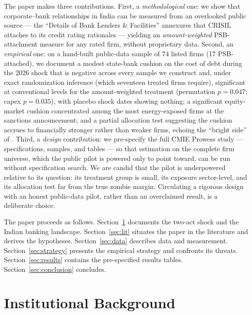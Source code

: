 \documentclass[12pt]{article}
\begin{document}
The paper makes three contributions. First, a \emph{methodological} one: we show that
corporate--bank relationships in India can be measured from an overlooked public source ---
the ``Details of Bank Lenders \& Facilities'' annexures that CRISIL attaches to its credit
rating rationales --- yielding an \emph{amount-weighted} PSB-attachment measure for any
rated firm, without proprietary data. Second, an \emph{empirical} one: on a hand-built
public-data sample of 74 listed firms (17 PSB-attached), we document a modest state-bank
cushion on the cost of debt during the 2026 shock that is negative across every sample we
construct and, under exact randomization inference (which seventeen treated firms require),
significant at conventional levels for the amount-weighted treatment (permutation $p=0.047$;
capex $p=0.035$), with placebo shock dates showing nothing; a significant equity-market
cushion concentrated among the most energy-exposed firms at the sanctions announcement; and
a partial allocation test suggesting the cushion accrues to financially stronger rather than
weaker firms, echoing the ``bright side'' of \citet{lin2015government}. Third, a \emph{design} contribution: we pre-specify the
full CMIE Prowess study --- specifications, samples, and tables --- so that estimation on the
complete firm universe, which the public pilot is powered only to point toward, can be run
without specification search. We are candid that the pilot is underpowered relative to its
question: its treatment group is small, its exposure sector-level, and its allocation test
far from the true zombie margin. Circulating a rigorous design with an honest public-data
pilot, rather than an overclaimed result, is a deliberate choice.

The paper proceeds as follows. Section~\ref{sec:background} documents the two-act shock and
the Indian banking landscape. Section~\ref{sec:lit} situates the paper in the literature and
derives the hypotheses. Section~\ref{sec:data} describes data and measurement.
Section~\ref{sec:strategy} presents the empirical strategy and confronts its threats.
Section~\ref{sec:results} contains the pre-specified results tables.
Section~\ref{sec:conclusion} concludes.

\section{Institutional Background}\label{sec:background}
\end{document}
